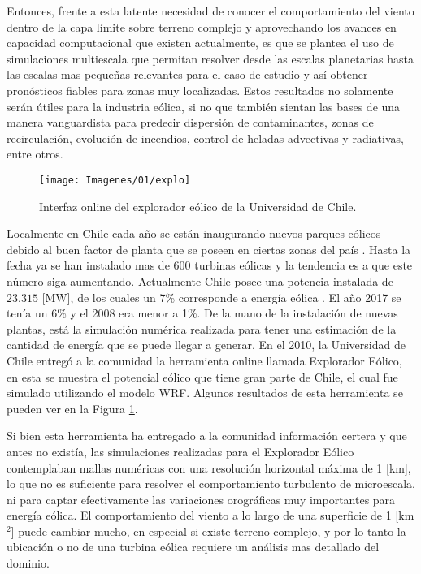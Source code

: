 Entonces, frente a esta latente necesidad de conocer el comportamiento del viento dentro de la capa límite sobre terreno complejo y aprovechando los avances en capacidad computacional que existen actualmente, es que se plantea el uso de simulaciones multiescala que permitan resolver desde las escalas planetarias hasta las escalas mas pequeñas relevantes para el caso de estudio y así obtener pronósticos fiables para zonas muy localizadas. Estos resultados no solamente serán útiles para la industria eólica, si no que también sientan las bases de una manera vanguardista para predecir dispersión de contaminantes, zonas de recirculación, evolución de incendios, control de heladas advectivas y radiativas, entre otros.

\begin{figure}[h]
	\centering
	\texttt{[image: Imagenes/01/explo]}
	\caption{Interfaz online del explorador eólico de la Universidad de Chile.}
	\label{fig:01_explorador}
\end{figure}

Localmente en Chile cada año se están inaugurando nuevos parques eólicos debido al buen factor de planta que se poseen en ciertas zonas del país \citep{anuariocne2018}. Hasta la fecha ya se han instalado mas de 600 turbinas eólicas y la tendencia es a que este número siga aumentando. Actualmente Chile posee una potencia instalada de $23.315$ [MW], de los cuales un 7\% corresponde a energía eólica \citep{anuariocne2018}. El año 2017 se tenía un 6\% y el 2008 era menor a 1\%. De la mano de la instalación de nuevas plantas, está la simulación numérica realizada para tener una estimación de la cantidad de energía que se puede llegar a generar. En el 2010, la Universidad de Chile entregó a la comunidad la herramienta online llamada Explorador Eólico, en esta se muestra el potencial eólico que tiene gran parte de Chile, el cual fue simulado utilizando el modelo WRF. Algunos resultados de esta herramienta se pueden ver en la Figura \ref{fig:01_explorador}.

Si bien esta herramienta ha entregado a la comunidad información certera y que antes no existía, las simulaciones realizadas para el Explorador Eólico contemplaban mallas numéricas con una resolución horizontal máxima de 1 [km], lo que no es suficiente para resolver el comportamiento turbulento de microescala, ni para captar efectivamente las variaciones orográficas muy importantes para energía eólica. El comportamiento del viento a lo largo de una superficie de 1 [km$^2$] puede cambiar mucho, en especial si existe terreno complejo, y por lo tanto la ubicación o no de una turbina eólica requiere un análisis mas detallado del dominio.

